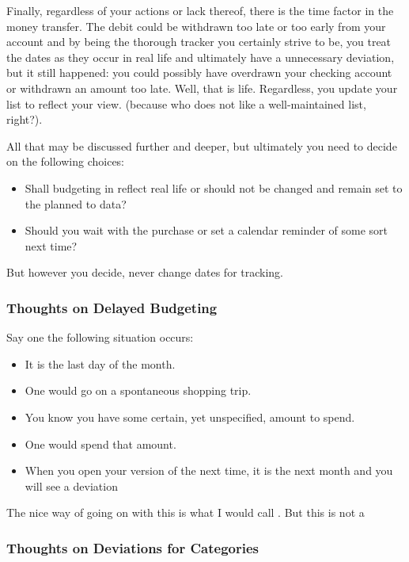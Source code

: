 Finally, regardless of your actions or lack thereof, there is the time factor in the money transfer.
The debit could be withdrawn too late or too early from your account and by being the thorough tracker you certainly strive to be, you treat the dates as they occur in real life and ultimately have a unnecessary deviation, but it still happened: you could possibly have overdrawn your checking account or withdrawn an amount too late.
Well, that is life.
Regardless, you update your list to reflect your view. (because who does not like a well-maintained list, right?). 

All that may be discussed further and deeper, but ultimately you need to decide on the following choices:
\begin{itemize}
	\item Shall budgeting in \tfn reflect real life or should \tfn not be changed and remain set to the planned to data?
	\item Should you wait with the purchase or set a calendar reminder of some sort next time?
\end{itemize}
\begin{specialnote}
	But however you decide, never change dates for tracking.
\end{specialnote}

\subsubsection{Thoughts on Delayed Budgeting}
\label{subsubsec:thoughts-delayed-budgeting}

Say one the following situation occurs:
\begin{itemize}
	\item It is the last day of the month.
	\item One would go on a spontaneous shopping trip.
	\item You know you have some certain, yet unspecified, amount to spend.
	\item One would spend that amount.
	\item When you open your version of \tfn the next time, it is the next month and you will see a deviation
\end{itemize}

The nice way of going on with this is what I would call .
But this is not a 

\subsubsection{Thoughts on Deviations for Categories}
\label{subsubsec:thoughts-deviations-for-categories}


